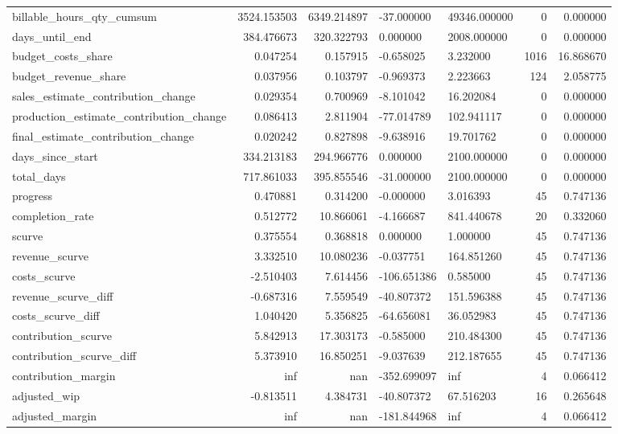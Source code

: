\begin{landscape}
\begin{longtable}[h!]{lrrllrr}
billable_hours_qty_cumsum & 3524.153503 & 6349.214897 & -37.000000 & 49346.000000 & 0 & 0.000000 \\
days_until_end & 384.476673 & 320.322793 & 0.000000 & 2008.000000 & 0 & 0.000000 \\
budget_costs_share & 0.047254 & 0.157915 & -0.658025 & 3.232000 & 1016 & 16.868670 \\
budget_revenue_share & 0.037956 & 0.103797 & -0.969373 & 2.223663 & 124 & 2.058775 \\
sales_estimate_contribution_change & 0.029354 & 0.700969 & -8.101042 & 16.202084 & 0 & 0.000000 \\
production_estimate_contribution_change & 0.086413 & 2.811904 & -77.014789 & 102.941117 & 0 & 0.000000 \\
final_estimate_contribution_change & 0.020242 & 0.827898 & -9.638916 & 19.701762 & 0 & 0.000000 \\
days_since_start & 334.213183 & 294.966776 & 0.000000 & 2100.000000 & 0 & 0.000000 \\
total_days & 717.861033 & 395.855546 & -31.000000 & 2100.000000 & 0 & 0.000000 \\
progress & 0.470881 & 0.314200 & -0.000000 & 3.016393 & 45 & 0.747136 \\
completion_rate & 0.512772 & 10.866061 & -4.166687 & 841.440678 & 20 & 0.332060 \\
scurve & 0.375554 & 0.368818 & 0.000000 & 1.000000 & 45 & 0.747136 \\
revenue_scurve & 3.332510 & 10.080236 & -0.037751 & 164.851260 & 45 & 0.747136 \\
costs_scurve & -2.510403 & 7.614456 & -106.651386 & 0.585000 & 45 & 0.747136 \\
revenue_scurve_diff & -0.687316 & 7.559549 & -40.807372 & 151.596388 & 45 & 0.747136 \\
costs_scurve_diff & 1.040420 & 5.356825 & -64.656081 & 36.052983 & 45 & 0.747136 \\
contribution_scurve & 5.842913 & 17.303173 & -0.585000 & 210.484300 & 45 & 0.747136 \\
contribution_scurve_diff & 5.373910 & 16.850251 & -9.037639 & 212.187655 & 45 & 0.747136 \\
contribution_margin & inf & nan & -352.699097 & inf & 4 & 0.066412 \\
adjusted_wip & -0.813511 & 4.384731 & -40.807372 & 67.516203 & 16 & 0.265648 \\
adjusted_margin & inf & nan & -181.844968 & inf & 4 & 0.066412 \\

\end{longtable}
\end{landscape}
